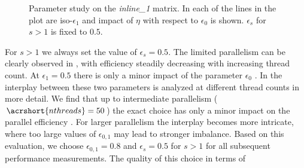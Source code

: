 \begin{figure}[t]
	\hspace{1.5em}
	\caption{Parameter study on the \emph{inline\_1} matrix. In  each of the lines in the plot are iso-$\epsilon_1$ and impact of $\eta$ with respect to $\epsilon_0$ is shown. $\epsilon_s$ for $s>1$ is fixed to $0.5$.}
	\label{fig:inline_param_study}
\end{figure}
%
For $s > 1$ we always set the   value of $\epsilon_s=0.5$. The limited
parallelism can be clearly observed in , with efficiency
steadily decreasing with increasing thread count. At
$\epsilon_1=0.5$ there is only a minor impact of the parameter
$\epsilon_0$ . In  the interplay
between these two parameters is analyzed at different thread counts in more
detail. We find that up to intermediate parallelism ($\acrshort{nthreads}=50$)
the exact choice has only a minor impact on the parallel efficiency 
. %
For larger parallelism the interplay becomes more intricate,
where too large values of $\epsilon_{0,1}$ may lead to stronger imbalance. Based
on this evaluation, we choose $\epsilon_{0,1}=0.8$ and $\epsilon_s=0.5$ for $s>1$
for all subsequent performance measurements. The quality of this choice in terms of
